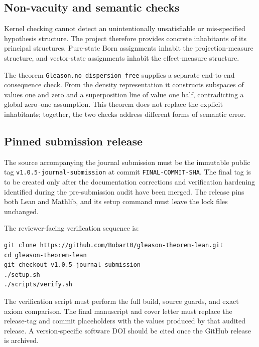 \documentclass[pdflatex,sn-mathphys-num]{sn-jnl}
\providecommand{\passthrough}[1]{#1}
\theoremstyle{thmstyleone}
\theoremstyle{thmstylethree}
\begin{document}
\subsection{Non-vacuity and semantic checks}\label{non-vacuity-and-semantic-checks}

Kernel checking cannot detect an unintentionally unsatisfiable or mis-specified hypothesis structure. The project therefore provides concrete inhabitants of its principal structures. Pure-state Born assignments inhabit the projection-measure structure, and vector-state assignments inhabit the effect-measure structure.

The theorem \passthrough{\lstinline!Gleason.no_dispersion_free!} supplies a separate end-to-end consequence check. From the density representation it constructs subspaces of values one and zero and a superposition line of value one half, contradicting a global zero--one assumption. This theorem does not replace the explicit inhabitants; together, the two checks address different forms of semantic error.

\subsection{Pinned submission release}\label{pinned-submission-release}

The source accompanying the journal submission must be the immutable public tag \passthrough{\lstinline!v1.0.5-journal-submission!} at commit \passthrough{\lstinline!FINAL-COMMIT-SHA!}. The final tag is to be created only after the documentation corrections and verification hardening identified during the pre-submission audit have been merged. The release pins both Lean and Mathlib, and its setup command must leave the lock files unchanged.

The reviewer-facing verification sequence is:

\begin{lstlisting}
git clone https://github.com/Bobart0/gleason-theorem-lean.git
cd gleason-theorem-lean
git checkout v1.0.5-journal-submission
./setup.sh
./scripts/verify.sh
\end{lstlisting}

The verification script must perform the full build, source guards, and exact axiom comparison. The final manuscript and cover letter must replace the release-tag and commit placeholders with the values produced by that audited release. A version-specific software DOI should be cited once the GitHub release is archived.
\end{document}
